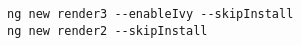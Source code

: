 \begin{verbatim}
ng new render3 --enableIvy --skipInstall
ng new render2 --skipInstall
\end{verbatim}
